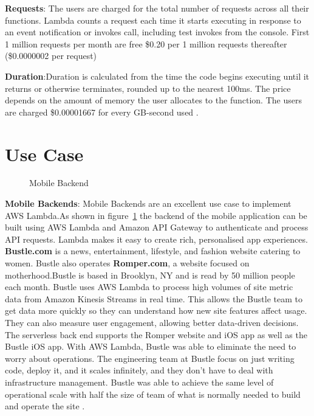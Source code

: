 \documentclass[9pt,twocolumn,twoside]{../../styles/osajnl}
\begin{document}
\textbf{Requests}: The users are charged for the total number of requests 
across all their functions. Lambda counts a request each time it starts 
executing in response to an event notification or invokes call, including test 
invokes from the console. First 1 million requests per month are free
\$0.20 per 1 million requests thereafter (\$0.0000002 per request)

\textbf{Duration}:Duration is calculated from the time the code begins 
executing until it returns or otherwise terminates, rounded up to the nearest 
100ms. The price depends on the amount of memory the user allocates to the 
function. The users are charged \$0.00001667 for every GB-second used 
\cite{www-AWSLambdaPricing}.

\section{Use Case}



\renewcommand{\labelitemi}{\scriptsize$\bullet$} 
\begin{figure}[H]
\centering
\graphicspath{ {images/} }
\caption{Mobile Backend} \cite{www-AWSLambda}
\label{fig:usecase1}
\end{figure}

\textbf{Mobile Backends}: Mobile Backends are an excellent use case to 
implement AWS Lambda.As shown in figure~\ref{fig:usecase1} the backend of the mobile application 
can be built using AWS Lambda and Amazon API Gateway to authenticate and 
process API requests. Lambda makes it easy to create rich, personalised app 
experiences.
\textbf{Bustle.com} is a news, entertainment, lifestyle, and fashion website 
catering to women. Bustle also operates \textbf{Romper.com}, a website focused 
on motherhood.Bustle is based in Brooklyn, NY and is read by 50 million people 
each month. Bustle uses AWS Lambda to process high volumes of site metric data 
from Amazon Kinesis Streams \cite{www-AWSKinesis} in real time. This allows the 
Bustle team to get data more quickly so they can understand how new site 
features affect usage. They can also measure user engagement, allowing better 
data-driven decisions. The serverless back end supports the Romper website and 
iOS app as well as the Bustle iOS app. With AWS Lambda, Bustle was able to 
eliminate the need to worry about operations. The engineering team at Bustle 
focus on just writing code, deploy it, and it scales infinitely, and they don't 
have to deal with infrastructure management. Bustle was able to achieve the 
same level of operational scale with half the size of team of what is normally 
needed to build and operate the site  \cite{www-AWSLambdaBustle}.
\end{document}
